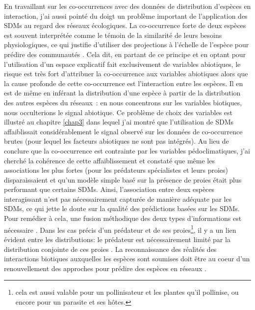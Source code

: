 En travaillant sur les co-occurrences avec des données de distribution
d'espèces en interaction, j'ai aussi pointé du doigt un problème
important de l'application des SDMs au regard des réseaux écologiques.
La co-occurrence forte de deux espèces est souvent interprétée comme le
témoin de la similarité de leurs besoins physiologiques, ce qui justifie
d'utiliser des projections à l'échelle de l'espèce pour prédire des
communautés \citep{Rehfeldt2006, Albouy2012}. Cela dit, en partant de ce
principe et en optant pour l'utilisation d'un espace explicatif fait
exclusivement de variables abiotiques, le risque est très fort
d'attribuer la co-occurrence aux variables abiotiques alors que la cause
profonde de cette co-occurrence est l'interaction entre les espèces. Il
en est de même en inférant la distribution d'une espèce à partir de la
distribution des autres espèces du réseaux~: en nous concentrons sur les
variables biotiques, nous occulterions le signal abiotique. Ce problème
de choix des variables est illustré au chapitre \ref{chap3} dans lequel
j'ai montré que l'utilisation de SDMs affaiblissait considérablement le
signal observé sur les données de co-occurrence brutes (pour lequel les
facteurs abiotiques ne sont pas intégrés). Au lieu de conclure que la
co-occurrence est contrainte par les variables pédoclimatiques, j'ai
cherché la cohérence de cette affaiblissement et constaté que même les
associations les plus fortes (pour les prédateurs spécialistes et leurs
proies) disparaissaient et qu'un modèle simple basé sur la présence de
proies était plus performant que certains SDMs. Ainsi, l'association
entre deux espèces interagissant n'est pas nécessairement capturée de
manière adéquate par les SDMs, ce qui jette le doute sur la qualité des
prédictions basées sur les SDMs. Pour remédier à cela, une fusion
méthodique des deux types d'informations est nécessaire
\citep{Meier2010, Thuiller2013}. Dans les cas précis d'un prédateur et
de ses proies\footnote{cela est aussi valable pour un pollinisateur et
  les plantes qu'il pollinise, ou encore pour un parasite et ses hôtes.},
il y a un lien évident entre les distributions: le prédateur est
nécessairement limité par la distribution conjointe de ces proies
\citep{Holt2009, Shenbrot2007}. La reconnaissance des réalités des
interactions biotiques auxquelles les espèces sont soumises doit être au
coeur d'un renouvellement des approches pour prédire des espèces en
réseaux \citep{Godsoe2015}.

